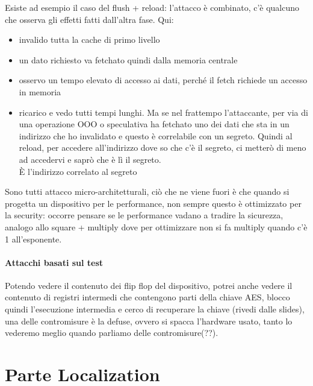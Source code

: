 \documentclass[oneside, 12pt]{extbook}
\begin{document}
Esiste ad esempio il caso del flush + reload: l'attacco è combinato, c'è qualcuno che osserva gli effetti fatti dall'altra fase. Qui:
\begin{itemize}
	\item invalido tutta la cache di primo livello
	\item un dato richiesto va fetchato quindi dalla memoria centrale
	\item osservo un tempo elevato di accesso ai dati, perché il fetch richiede un accesso in memoria
	\item ricarico e vedo tutti tempi lunghi. Ma se nel frattempo l'attaccante, per via di una operazione OOO o speculativa ha fetchato uno dei dati che sta in un indirizzo che ho invalidato e questo è correlabile con un segreto. Quindi al reload, per accedere all'indirizzo dove so che c'è il segreto, ci metterò di meno ad accedervi e saprò che è lì il segreto.\\È l'indirizzo correlato al segreto
\end{itemize}
Sono tutti attacco micro-architetturali, ciò che ne viene fuori è che quando si progetta un dispositivo per le performance, non sempre questo è ottimizzato per la security: occorre pensare se le performance vadano a tradire la sicurezza, analogo allo square + multiply dove per ottimizzare non si fa multiply quando c'è 1 all'esponente.
\subsection{Attacchi basati sul test}
Potendo vedere il contenuto dei flip flop del dispositivo, potrei anche vedere il contenuto di registri intermedi che contengono parti della chiave AES, blocco quindi l'esecuzione intermedia e cerco di recuperare la chiave (rivedi dalle slides), una delle contromisure è la defuse, ovvero si spacca l'hardware usato, tanto lo vederemo meglio quando parliamo delle contromisure(??).




\part{Parte Localization}
\end{document}
